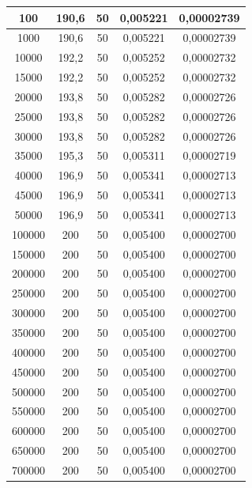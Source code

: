 \begin{table}[!ht]
\begin{tabular}{|c|c|c|c|c|}
      
100	& 190,6	& 50 &	0,005221 &	0,00002739 \\ \hline
1000	& 190,6 &	50 &	0,005221 &	0,00002739 \\ \hline
10000	& 192,2	& 50 &	0,005252 &	0,00002732 \\ \hline
15000	& 192,2	& 50 &	0,005252 &	0,00002732 \\ \hline
20000	& 193,8 &	50 &	0,005282 &	0,00002726 \\ \hline
25000	& 193,8 &	50 &	0,005282 &	0,00002726 \\ \hline
30000	& 193,8 &	50 &	0,005282 &	0,00002726 \\ \hline
35000	& 195,3 &	50 &	0,005311 &	0,00002719 \\ \hline
40000	& 196,9 &	50 &	0,005341 &	0,00002713 \\ \hline
45000	& 196,9 &	50 &	0,005341 &	0,00002713 \\ \hline
50000	& 196,9	& 50 &	0,005341 &	0,00002713 \\ \hline
100000	& 200	& 50 &	0,005400 &	0,00002700 \\ \hline
150000	& 200	& 50 &	0,005400 &	0,00002700 \\ \hline
200000	& 200	& 50 &	0,005400 &	0,00002700 \\ \hline
250000	& 200	& 50 &	0,005400 &	0,00002700 \\ \hline
300000	& 200	& 50 &	0,005400 &	0,00002700 \\ \hline
350000	& 200	& 50 &	0,005400 &	0,00002700 \\ \hline
400000	& 200	& 50 &	0,005400 &	0,00002700 \\ \hline
450000	& 200	& 50 &	0,005400 &	0,00002700 \\ \hline
500000	& 200	& 50 &	0,005400 &	0,00002700 \\ \hline
550000	& 200	& 50 &	0,005400 &	0,00002700 \\ \hline
600000	& 200	& 50 &	0,005400 &	0,00002700 \\ \hline
650000	& 200	& 50 &	0,005400 &	0,00002700 \\ \hline
700000	& 200	& 50 &	0,005400 &	0,00002700	\\ \hline												
        
    \end{tabular}
\end{table}

